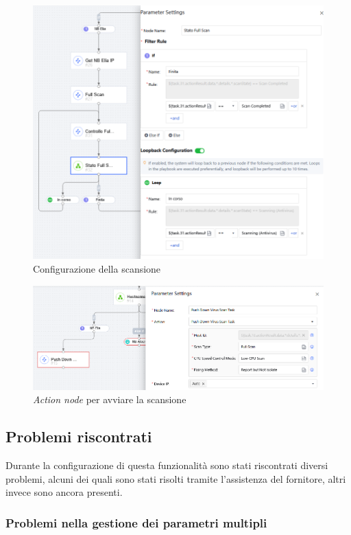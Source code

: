 \begin{figure}[!htbp]
    \centering
    \includegraphics[width=0.9\linewidth]{images/ndr/scan-action-flow.png}
    \caption{Configurazione della scansione}
    \label{fig:scan-action-flow}
\end{figure}

\begin{figure}[!htbp]
    \centering
    \includegraphics[width=0.9\linewidth]{images/ndr/scan-action-node.png}
    \caption{\emph{Action node} per avviare la scansione}
    \label{fig:scan-action-node}
\end{figure}

\subsection{Problemi riscontrati}

Durante la configurazione di questa funzionalità sono stati riscontrati diversi problemi, alcuni dei quali sono stati risolti tramite l'assistenza del fornitore, altri invece sono ancora presenti.

\subsubsection{Problemi nella gestione dei parametri multipli}

